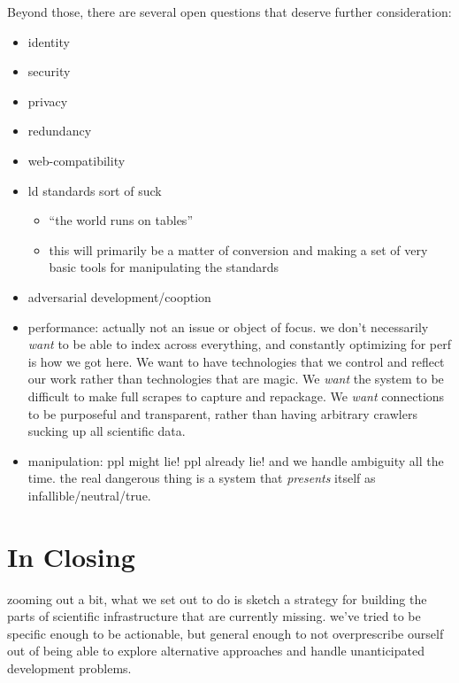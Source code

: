 Beyond those, there are several open questions that deserve further
consideration:

\begin{itemize}
\tightlist
\item
  identity
\item
  security
\item
  privacy
\item
  redundancy
\item
  web-compatibility
\item
  ld standards sort of suck

  \begin{itemize}
  \tightlist
  \item
    ``the world runs on tables''
  \item
    this will primarily be a matter of conversion and making a set of
    very basic tools for manipulating the standards
  \end{itemize}
\item
  adversarial development/cooption
\item
  performance: actually not an issue or object of focus. we don't
  necessarily \emph{want} to be able to index across everything, and
  constantly optimizing for perf is how we got here. We want to have
  technologies that we control and reflect our work rather than
  technologies that are magic. We \emph{want} the system to be difficult
  to make full scrapes to capture and repackage. We \emph{want}
  connections to be purposeful and transparent, rather than having
  arbitrary crawlers sucking up all scientific data.
\item
  manipulation: ppl might lie! ppl already lie! and we handle ambiguity
  all the time. the real dangerous thing is a system that
  \emph{presents} itself as infallible/neutral/true.
\end{itemize}

\hypertarget{in-closing}{%
\section{In Closing}\label{in-closing}}

zooming out a bit, what we set out to do is sketch a strategy for
building the parts of scientific infrastructure that are currently
missing. we've tried to be specific enough to be actionable, but general
enough to not overprescribe ourself out of being able to explore
alternative approaches and handle unanticipated development problems.

